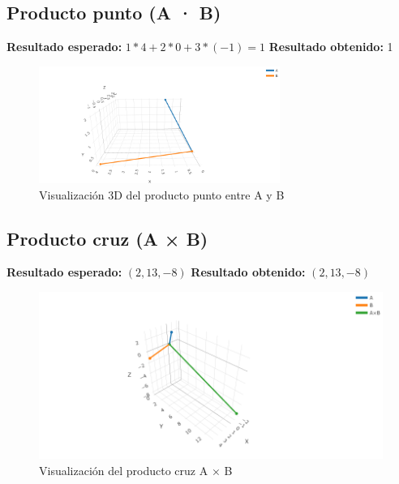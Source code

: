 \documentclass[12pt,a4paper]{article}
\begin{document}
\subsection{Producto punto (A · B)}
\textbf{Resultado esperado:} $1*4 + 2*0 + 3*(-1) = 1$  
\textbf{Resultado obtenido:} 1
\begin{figure}[H]
    \centering
    \includegraphics[width=0.7\textwidth]{imagenes/punto_ab.png} %
    \caption{Visualización 3D del producto punto entre A y B}
\end{figure}


\subsection{Producto cruz (A × B)}
\textbf{Resultado esperado:} $(2, 13, -8)$  
\textbf{Resultado obtenido:} $(2, 13, -8)$  

\begin{figure}[H]
    \centering
    \includegraphics[width=1\textwidth]{imagenes/cruz_ab.png} %
    \caption{Visualización del producto cruz A × B}
\end{figure}
\end{document}
